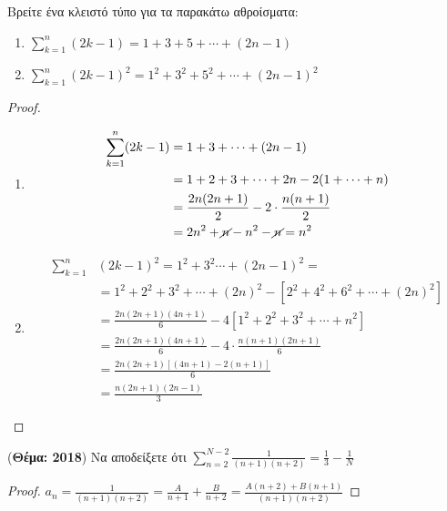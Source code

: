 \documentclass[a4paper,table]{report}
\begin{document}
\begin{multicols}{2}
\begin{enumerate}
    \item \label{ask:sums} \textcolor{Col1}{Βρείτε ένα κλειστό τύπο για τα 
        παρακάτω αθροίσματα: 
        \begin{enumerate}
          \item $ \sum_{k=1}^{n} (2k-1) = 1 + 3 + 5 + \cdots + (2n-1)  $
          \item $ \sum_{k=1}^{n} (2k-1)^{2} = 1^{2} + 3^{2} + 5^{2} 
            + \cdots + (2n-1)^{2}  $ 
      \end{enumerate}}
      \begin{proof}
      \item {}
        \begin{enumerate}
          \item \begin{align*}
              \sum_{k=1}^{n} (2k-1) &= 1 + 3 + \cdots + (2n-1) \\
                                    &=1 + 2 + 3 +\cdots +2n - 2(1+\cdots +n) \\
                                    &= \frac{2n(2n+1)}{2}-2 \cdot \frac{n(n+1)}{2} \\
                                    &=2n^{2}+\cancel{n}-n^{2}-\cancel{n} =n^{2}
            \end{align*}
          \item \begin{align*}
              \sum_{k=1}^{n}
              & (2k-1)^{2} =1^{2}+3^{2}\cdots + (2n-1)^{2} = \\
              &=1^{2}+2^{2}+3^{2}+\cdots +(2n)^{2}-[2^{2}+4^{2}+6^{2}+\cdots +
              (2n)^{2}] \\
              &= \frac{2n(2n+1)(4n+1)}{6} - 4[1^{2}+2^{2}+3^{2}+\cdots +n^{2}] \\
              &= \frac{2n(2n+1)(4n+1)}{6} - 4 \cdot \frac{n(n+1)(2n+1)}{6} \\
              &= \frac{2n(2n+1)[(4n+1)-2(n+1)]}{6} \\
              &= \frac{n(2n+1)(2n-1)}{3} 
            \end{align*}
        \end{enumerate}
      \end{proof}

    \item \label{ask:thema18sum} \textcolor{Col1}{({\bfseries Θέμα: 2018}) 
        Να αποδείξετε ότι $ \sum_{n=2}^{N-2} \frac{1}{(n+1)(n+2)} 
      = \frac{1}{3} - \frac{1}{N} $}
      \begin{proof}
      \item {}
        $ a_n = \frac{1}{(n+1)(n+2)} = \frac{A}{n+1} + \frac{B}{n+2} = 
        \frac{A(n+2)+B(n+1)}{(n+1)(n+2)} $


\end{proof}
\end{enumerate}
\end{multicols}
\end{document}
